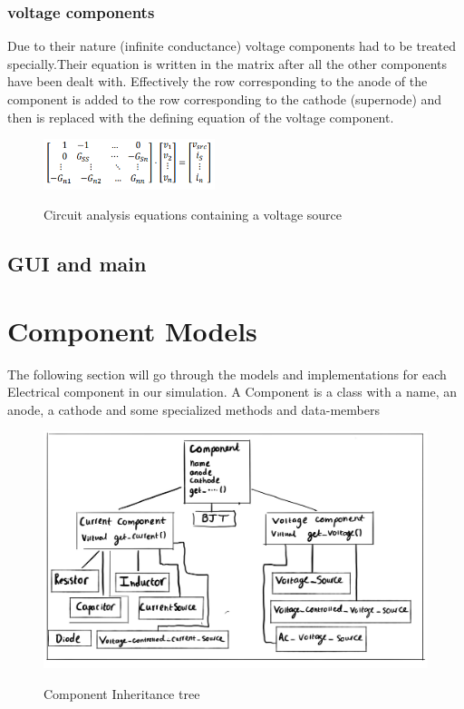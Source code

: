 \documentclass{article}
\begin{document}
\subsubsection{voltage components}
Due to their nature (infinite conductance) voltage components had to be treated specially.Their equation is written in the matrix after all the other components have been dealt with. Effectively the row corresponding to the anode of the component is added to the row corresponding to the cathode (supernode) and then is replaced with the defining equation of the voltage component.
\begin{figure}[h]
    \caption{Circuit analysis equations containing a voltage source}
    \centering
    \includegraphics[width=5cm]{images/Voltage_source_matrix.PNG}
    \label{fig:VoltCompConductanceMat}
\end{figure}
\subsection{GUI and main}



\newpage



\section{Component Models}
The following section will go through the models and implementations for each Electrical component in our simulation.
A Component is a class with a name, an anode, a cathode and some specialized methods and data-members
\begin{figure}[h]
    \caption{Component Inheritance tree}
    \centering
    \includegraphics[width=12cm]{images/Comphpp1.jpg}
    \label{fig:Comp}
\end{figure}
\end{document}
